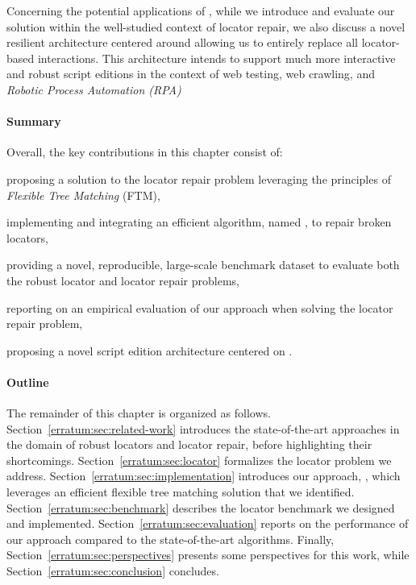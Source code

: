 Concerning the potential applications of \erratum, while we introduce and evaluate our solution within the well-studied context of locator repair, we also discuss a novel resilient architecture centered around \erratum allowing us to entirely replace all locator-based interactions.
This architecture intends to support much more interactive and robust script editions in the context of web testing, web crawling, and \emph{Robotic Process Automation (RPA)}~\cite{ivanvcic2019robotic}

\paragraph{Summary}
Overall, the key contributions in this chapter consist of:
\begin{compactenum}
    \item proposing a solution to the locator repair problem leveraging the principles of \emph{Flexible Tree Matching} (FTM),
    \item implementing and integrating an efficient algorithm, named \erratum, to repair broken locators,
    \item providing a novel, reproducible, large-scale benchmark dataset to evaluate both the robust locator and locator repair problems,
    \item reporting on an empirical evaluation of our approach when solving the locator repair problem,
    \item proposing a novel script edition architecture centered on \erratum.
\end{compactenum}

\paragraph{Outline}
The remainder of this chapter is organized as follows.
Section~\ref{erratum:sec:related-work} introduces the state-of-the-art approaches in the domain of robust locators and locator repair, before highlighting their shortcomings.
Section~\ref{erratum:sec:locator} formalizes the locator problem we address.
Section~\ref{erratum:sec:implementation} introduces our approach, \erratum, which leverages an efficient flexible tree matching solution that we identified.
Section~\ref{erratum:sec:benchmark} describes the locator benchmark we designed and implemented.
Section~\ref{erratum:sec:evaluation} reports on the performance of our approach compared to the state-of-the-art algorithms.
Finally, Section~\ref{erratum:sec:perspectives} presents some perspectives for this work, while Section~\ref{erratum:sec:conclusion} concludes.

